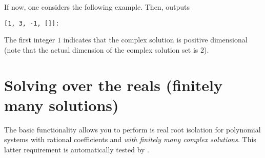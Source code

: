 \documentclass[a4paper,english,11pt]{scrartcl}
\theoremstyle{definition}
\theoremstyle{remark}
\begin{document}
If now, one considers the following example.
Then, \msolve outputs
\begin{tcolorbox}
  \begin{lstlisting}[basicstyle=\normalsize\ttfamily]
[1, 3, -1, []]:
  \end{lstlisting}
\end{tcolorbox}
The first integer $1$ indicates that the complex solution is positive
dimensional (note that the actual dimension of the complex solution set is $2$).


\section{Solving over the reals (finitely many solutions)}\label{sec:solvingreals}

The basic functionality \msolve allows you to perform is real root
isolation for polynomial systems with rational coefficients and {\em with
  finitely many complex solutions}. This latter requirement is automatically
tested by \msolve. 
\end{document}
